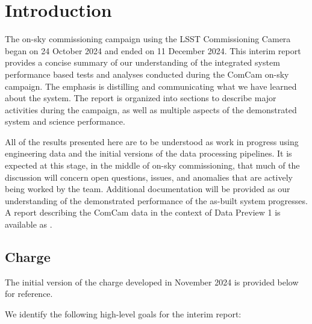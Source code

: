 \section{Introduction}
\label{sec:introduction}

The \VeraRubinObservatory on-sky commissioning campaign using the LSST Commissioning Camera \citep[LSSTComCam, hereafter ComCam;][]{10.71929/rubin/2561361} began on 24 October 2024 and ended on 11 December 2024.
This interim report provides a concise summary of our understanding of the integrated system performance based tests and analyses conducted during the ComCam on-sky campaign.
The emphasis is distilling and communicating what we have learned about the system.
The report is organized into sections to describe major activities during the campaign, as well as multiple aspects of the demonstrated system and science performance.

\begin{warning}
All of the results presented here are to be understood as work in progress using engineering data and the
initial versions of the data processing pipelines.
It is expected at this stage, in the middle of on-sky commissioning, that much of the discussion will concern open questions, issues, and anomalies that are actively being worked by the team.
Additional documentation will be provided as our understanding of the demonstrated performance of the as-built system progresses.
A report describing the ComCam data in the context of Data Preview 1 is available as .
\end{warning}

\subsection{Charge}

\begin{note}
    The initial version of the charge developed in November 2024 is provided below for reference.
\end{note}

We identify the following high-level goals for the interim report:

